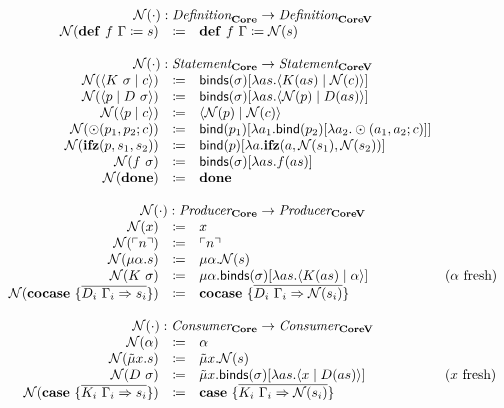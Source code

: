 \[
  \begin{array}{rcll}
    \\
    \multicolumn{4}{c}{\name{\cdot} : \emph{Definition}_{\targetlang{}} \rightarrow \emph{Definition}_{\targetvar{}}}\\
    \name{\defi{f\ \Gamma}{s}} & \coloneq & \defi{f\ \Gamma}{\name{s}} & \\
    \\
    \multicolumn{4}{c}{\name{\cdot} : \emph{Statement}_{\targetlang{}} \rightarrow \emph{Statement}_{\targetvar{}}}\\
    \name{\cut{K\ \sigma}{c}} & \coloneq & \binds{\sigma}{\lambda as.\cut{K(as)}{\name{c}}} & \\
    \name{\cut{p}{D\ \sigma}} & \coloneq & \binds{\sigma}{\lambda as.\cut{\name{p}}{D(as)}} & \\
    \name{\cut{p}{c}} & \coloneq & \cut{\name{p}}{\name{c}} & \\
    \name{\odot(p_1, p_2; c)}{} & \coloneq & \bind{p_1}{\lambda a_1.\bind{p_2}{\lambda a_2.\odot(a_1, a_2; c)}} & \\
    \name{\ifz{p}{s_1}{s_2}}{} & \coloneq & \bind{p}{\lambda a.\ifz{a}{\name{s_1}}{\name{s_2}}} & \\
    \name{f\ \sigma}{} & \coloneq & \binds{\sigma}{\lambda as.f(as)} & \\
    \name{\done}{} & \coloneq & \done & \\
    \\
    \multicolumn{4}{c}{\name{\cdot} : \emph{Producer}_{\targetlang{}} \rightarrow \emph{Producer}_{\targetvar{}}}\\
    \name{x} & \coloneq & x & \\
    \name{\lit{n}} & \coloneq & \lit{n} & \\
    \name{\mu\alpha.s} & \coloneq & \mu\alpha.\name{s} & \\
    \name{K\ \sigma} & \coloneq & \mu\alpha.\binds{\sigma}{\lambda as.\cut{K(as)}{\alpha}} & \fresh{\alpha} \\
    \name{\cocase{\overline{D_i\ \Gamma_i \Rightarrow s_i}}} & \coloneq & \cocase{\overline{D_i\ \Gamma_i \Rightarrow \name{s_i}}} & \\
    \\
    \multicolumn{4}{c}{\name{\cdot} : \emph{Consumer}_{\targetlang{}} \rightarrow \emph{Consumer}_{\targetvar{}}}\\
    \name{\alpha} & \coloneq & \alpha & \\
    \name{\tilde{\mu}x.s} & \coloneq & \tilde{\mu}x.\name{s} & \\
    \name{D\ \sigma} & \coloneq & \tilde{\mu}x.\binds{\sigma}{\lambda as.\cut{x}{D(as)}} & \fresh{x} \\
    \name{\case{\overline{K_i\ \Gamma_i \Rightarrow s_i}}} & \coloneq & \case{\overline{K_i\ \Gamma_i \Rightarrow \name{s_i}}} & \\
  \end{array}
\]


